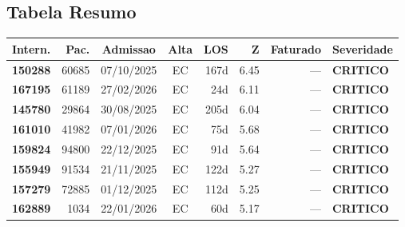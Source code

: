 \documentclass[a4paper,10pt]{article}
\begin{document}
\subsection{Tabela Resumo}
\begin{center}
\begin{longtable}{>{\scriptsize}r>{\scriptsize}r>{\scriptsize}c>{\scriptsize}c>{\scriptsize}r>{\scriptsize}r>{\scriptsize}r>{\scriptsize}l}
\toprule
\textbf{Intern.} & \textbf{Pac.} & \textbf{Admissao} & \textbf{Alta} & \textbf{LOS} & \textbf{Z} & \textbf{Faturado} & \textbf{Severidade} \\
\midrule
\endhead
\bottomrule
\endfoot

\textcolor{anomred}{\textbf{150288}} & 60685 & 07/10/2025 & \textcolor{anomorange}{EC} & 167d & \textcolor{anomred}{6.45} & --- & \textcolor{anomred}{\textbf{CRITICO}} \\

\textcolor{anomred}{\textbf{167195}} & 61189 & 27/02/2026 & \textcolor{anomorange}{EC} & 24d & \textcolor{anomred}{6.11} & --- & \textcolor{anomred}{\textbf{CRITICO}} \\

\textcolor{anomred}{\textbf{145780}} & 29864 & 30/08/2025 & \textcolor{anomorange}{EC} & 205d & \textcolor{anomred}{6.04} & --- & \textcolor{anomred}{\textbf{CRITICO}} \\

\textcolor{anomred}{\textbf{161010}} & 41982 & 07/01/2026 & \textcolor{anomorange}{EC} & 75d & \textcolor{anomred}{5.68} & --- & \textcolor{anomred}{\textbf{CRITICO}} \\

\textcolor{anomred}{\textbf{159824}} & 94800 & 22/12/2025 & \textcolor{anomorange}{EC} & 91d & \textcolor{anomred}{5.64} & --- & \textcolor{anomred}{\textbf{CRITICO}} \\

\textcolor{anomred}{\textbf{155949}} & 91534 & 21/11/2025 & \textcolor{anomorange}{EC} & 122d & \textcolor{anomred}{5.27} & --- & \textcolor{anomred}{\textbf{CRITICO}} \\

\textcolor{anomred}{\textbf{157279}} & 72885 & 01/12/2025 & \textcolor{anomorange}{EC} & 112d & \textcolor{anomred}{5.25} & --- & \textcolor{anomred}{\textbf{CRITICO}} \\

\textcolor{anomred}{\textbf{162889}} & 1034 & 22/01/2026 & \textcolor{anomorange}{EC} & 60d & \textcolor{anomred}{5.17} & --- & \textcolor{anomred}{\textbf{CRITICO}} \\


\end{longtable}
\end{center}
\end{document}
